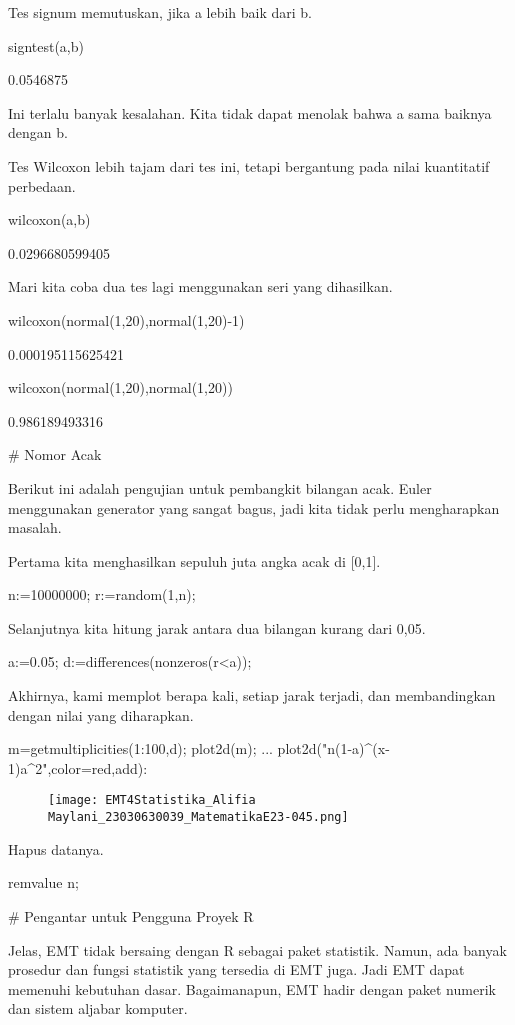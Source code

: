 \documentclass{article}
\begin{document}
Tes signum memutuskan, jika a lebih baik dari b.


\>signtest(a,b)


    0.0546875

Ini terlalu banyak kesalahan. Kita tidak dapat menolak bahwa a sama
baiknya dengan b.


Tes Wilcoxon lebih tajam dari tes ini, tetapi bergantung pada nilai
kuantitatif perbedaan.


\>wilcoxon(a,b)


    0.0296680599405

Mari kita coba dua tes lagi menggunakan seri yang dihasilkan.


\>wilcoxon(normal(1,20),normal(1,20)-1)


    0.000195115625421

\>wilcoxon(normal(1,20),normal(1,20))


    0.986189493316

# Nomor Acak

Berikut ini adalah pengujian untuk pembangkit bilangan acak. Euler
menggunakan generator yang sangat bagus, jadi kita tidak perlu
mengharapkan masalah.


Pertama kita menghasilkan sepuluh juta angka acak di [0,1].


\>n:=10000000; r:=random(1,n);


Selanjutnya kita hitung jarak antara dua bilangan kurang dari 0,05.


\>a:=0.05; d:=differences(nonzeros(r<a));


Akhirnya, kami memplot berapa kali, setiap jarak terjadi, dan
membandingkan dengan nilai yang diharapkan.


\>m=getmultiplicities(1:100,d); plot2d(m); ...  
\>     plot2d("n\*(1-a)^(x-1)\*a^2",color=red,\>add):


\begin{figure}
    \centering
    \texttt{[image: EMT4Statistika\_Alifia Maylani\_23030630039\_MatematikaE23-045.png]}
    \caption{}
    \label{fig:enter-label}
\end{figure}

Hapus datanya.


\>remvalue n;


# Pengantar untuk Pengguna Proyek R

Jelas, EMT tidak bersaing dengan R sebagai paket statistik. Namun, ada
banyak prosedur dan fungsi statistik yang tersedia di EMT juga. Jadi
EMT dapat memenuhi kebutuhan dasar. Bagaimanapun, EMT hadir dengan
paket numerik dan sistem aljabar komputer.
\end{document}
